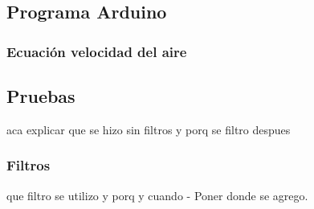 

    \subsection{Programa Arduino}
        \subsubsection{Ecuación velocidad del aire}
    \subsection{Pruebas}
    aca explicar que se hizo sin filtros y porq se filtro despues
        \subsubsection{Filtros}
        que filtro se utilizo y porq y cuando
    - Poner donde se agrego.

\newpage